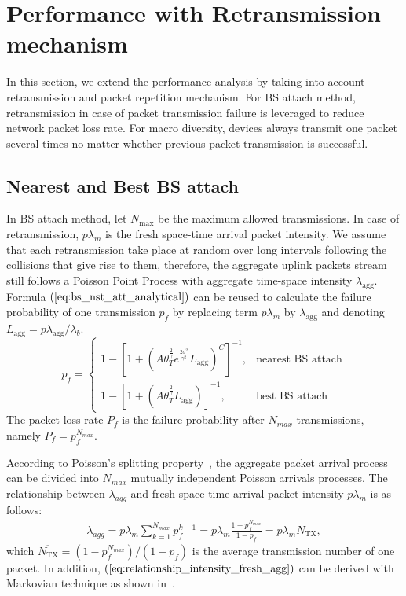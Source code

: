 \section{Performance with Retransmission mechanism}
In this section, we extend the performance analysis by taking into account retransmission and packet repetition mechanism. For BS attach method, retransmission in case of packet transmission failure is leveraged to reduce network packet loss rate. For macro diversity, devices always transmit one packet several times no matter whether previous packet transmission is successful.

\subsection{Nearest and Best BS attach}
In BS attach method, let $N_{\text{max}}$ be the maximum allowed transmissions. In case of retransmission, $p\lambda_{m}$ is the fresh space-time arrival packet intensity. We assume that each retransmission take place at random over long intervals following the collisions that give rise to them, therefore, the aggregate uplink packets stream still follows a Poisson Point Process with aggregate time-space intensity $\lambda_{\text{agg}}$. Formula $(\ref{eq:bs_nst_att_analytical})$ can be reused to calculate the failure probability of one transmission $p_f$ by replacing term $p\lambda_{m}$ by $\lambda_{\text{agg}}$ and denoting $L_{\text{agg}} = p\lambda_{\text{agg}}/\lambda_{b}$.
\[
	p_{f}=\left\{
	\begin{array}{ll}
	1-\left[ 1 + \left(A \theta_{T}^{\frac{2}{\gamma}} e^{\frac{2\sigma^2}{\gamma^2}}  L_{\text{agg}} \right) ^{C} \right] ^{-1}, & \text{nearest BS attach}\\
	1-\left[ 1 + \left(A \theta_{T}^{\frac{2}{\gamma}} L_{\text{agg}} \right) \right] ^{-1}, & \text{best BS attach}
	\end{array}
	\right.
\]
The packet loss rate $P_{f}$ is the failure probability after $N_{max}$ transmissions, namely $P_{f} =  p_f^{N_{max}} $.

According to Poisson's splitting property~\cite{meyn2012markov}, the aggregate packet arrival process can be divided into $N_{max}$ mutually independent Poisson arrivals processes. The relationship between $\lambda_{agg} $ and fresh space-time arrival packet intensity $p\lambda_{m}$ is as follows:
\begin{align}
\label{eq:relationship_intensity_fresh_agg}
\lambda_{agg} = p \lambda_m\sum_{k=1}^{N_{max}}  p_f^{k-1}
= p \lambda_m \frac{1-p_f^{N_{max}}}{1-p_f} = p\lambda_{m} \overline{N_{\text{TX}}},
\end{align}
which $\overline{N_{\text{TX}}} = (1-p_f^{N_{max}})/(1-p_f)$ is the average transmission number of one packet. In addition, $(\ref{eq:relationship_intensity_fresh_agg})$ can be derived with Markovian technique as shown in~\cite{nielsen2015tractable}. 

